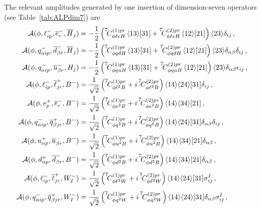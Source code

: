 The relevant amplitudes generated by one insertion of dimension-seven operators (see Table~\ref{tab:ALPdim7}) are 
\begin{align}
    \mathcal A(\phi,\ell^-_{ip},\overline e_r^-,\overline H_j)&=-\frac{1}{2}\left(\coef{7}{\phi \ell e H}{(1)pr} \, \agl{1}{3}\sqr{3}{1} + \coef{7}{\phi \ell e H}{(2)pr} \, \agl{1}{2}\sqr{2}{1}\right)\agl{2}{3}\delta_{ij}\,,
    \\
    \mathcal A(\phi,q^-_{\alpha ip},\overline d_{\beta r}^-,\overline H_j)&=-\frac{1}{2}\left(\coef{7}{\phi qd H}{(1)pr} \, \agl{1}{3}\sqr{3}{1} + \coef{7}{\phi qd H}{(2)pr} \, \agl{1}{2}\sqr{2}{1}\right)\agl{2}{3}\delta_{\alpha\beta}\delta_{ij}\,,
    \\
    \mathcal A(\phi,q^-_{\alpha ip},\overline u_{\beta r}^-, H_j)&=-\frac{1}{2}\left(\coef{7}{\phi qu H}{(1)pr} \, \agl{1}{3}\sqr{3}{1} + \coef{7}{\phi qu H}{(2)pr} \, \agl{1}{2}\sqr{2}{1}\right)\agl{2}{3}\delta_{\alpha\beta}\epsilon_{ij}\,,
    \\
    \mathcal A(\phi,\ell_{ip}^-,\overline \ell_{jr}^+,B^-) &= \frac{1}{\sqrt{2}}\left(\coef{7}{\phi \ell^2 B}{(1)pr} + i\,\coef{7}{\phi \ell^2 B}{(2)pr}\right) \agl{1}{4}\agl{2}{4}\sqr{3}{1}\delta_{ij} \,,
    \\
    \mathcal A(\phi,e_{p}^+,\overline e_{r}^-,B^-) &= \frac{1}{\sqrt{2}}\left(\coef{7}{\phi e^2 B}{(1)pr} + i\,\coef{7}{\phi e^2 B}{(2)pr}\right) \agl{1}{4}\agl{3}{4}\sqr{2}{1} \,,
    \\
    \mathcal A(\phi,q_{\alpha ip}^-,\overline q_{\beta jr}^+,B^-) &= \frac{1}{\sqrt{2}}\left(\coef{7}{\phi q^2 B}{(1)pr} + i\,\coef{7}{\phi q^2 B}{(2)pr}\right) \agl{1}{4}\agl{2}{4}\sqr{3}{1}\delta_{\alpha\beta}\delta_{ij} \,,
    \\
    \mathcal A(\phi,u_{\alpha p}^+,\overline u_{\beta r}^-,B^-) &= \frac{1}{\sqrt{2}}\left(\coef{7}{\phi u^2 B}{(1)pr} + i\,\coef{7}{\phi u^2 B}{(2)pr}\right) \agl{1}{4}\agl{3}{4}\sqr{2}{1}\delta_{\alpha\beta} \,,
    \\
    \mathcal A(\phi,d_{\alpha p}^+,\overline d_{\beta r}^-,B^-) &= \frac{1}{\sqrt{2}}\left(\coef{7}{\phi d^2 B}{(1)pr} + i\,\coef{7}{\phi d^2 B}{(2)pr}\right) \agl{1}{4}\agl{3}{4}\sqr{2}{1}\delta_{\alpha\beta} \,,
    \\
    \mathcal A(\phi,\ell_{ip}^-,\overline \ell_{jr}^+,W_I^-) &= \frac{1}{\sqrt{2}}\left(\coef{7}{\phi \ell^2 W}{(1)pr} + i\,\coef{7}{\phi \ell^2 W}{(2)pr}\right) \agl{1}{4}\agl{2}{4}\sqr{3}{1}\sigma^I_{ij} \,,
    \\
    \mathcal A(\phi,q_{\alpha ip}^-,\overline q_{\beta jr}^+,W_I^-) &= \frac{1}{\sqrt{2}}\left(\coef{7}{\phi q^2 W}{(1)pr} + i\,\coef{7}{\phi q^2 W}{(2)pr}\right) \agl{1}{4}\agl{2}{4}\sqr{3}{1}\delta_{\alpha\beta}\sigma^I_{ij} \,,

\end{align}

